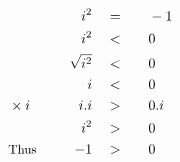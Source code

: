 \begin{alignat*}{7}
&\,&i^2\quad&=\quad&&-1\\
&\,&i^2\quad&<&&0\\
&\,&\sqrt{i^2}\quad&<&&0\\
&\,&i\quad&<&&0\\
&\small\times i\qquad&i.i\quad&>&&0.i\\
&\,&i^2\quad&>&&0\\
&\small\text{Thus}&-1\quad&>&&0
\end{alignat*}
